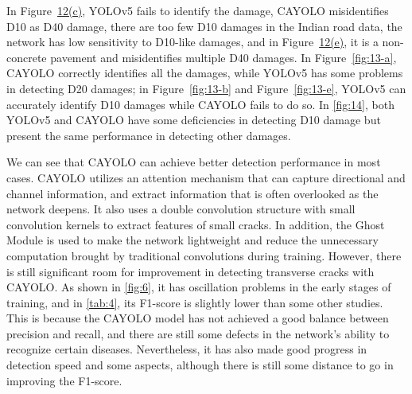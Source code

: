 \documentclass[sensors,article,submit,moreauthors]{Definitions/mdpi}
\begin{document}
    In Figure~\hyperref[fig:12-c]{12(c)}, YOLOv5 fails to identify the damage, CAYOLO misidentifies D10 as D40 damage, there are too few D10 damages in the Indian road data, the network has low sensitivity to D10-like damages, and in Figure~\hyperref[fig:12-e]{12(e)}, it is a non-concrete pavement and misidentifies multiple D40 damages. In Figure~\autoref{fig:13-a}, CAYOLO correctly identifies all the damages, while YOLOv5 has some problems in detecting D20 damages; in Figure~\autoref{fig:13-b} and Figure~\autoref{fig:13-e}, YOLOv5 can accurately identify D10 damages while CAYOLO fails to do so. In \autoref{fig:14}, both YOLOv5 and CAYOLO have some deficiencies in detecting D10 damage but present the same performance in detecting other damages.

    We can see that CAYOLO can achieve better detection performance in most cases. CAYOLO utilizes an attention mechanism that can capture directional and channel information, and extract information that is often overlooked as the network deepens. It also uses a double convolution structure with small convolution kernels to extract features of small cracks. In addition, the Ghost Module is used to make the network lightweight and reduce the unnecessary computation brought by traditional convolutions during training. However, there is still significant room for improvement in detecting transverse cracks with CAYOLO. As shown in \autoref{fig:6}, it has oscillation problems in the early stages of training, and in \autoref{tab:4}, its F1-score is slightly lower than some other studies. This is because the CAYOLO model has not achieved a good balance between precision and recall, and there are still some defects in the network's ability to recognize certain diseases. Nevertheless, it has also made good progress in detection speed and some aspects, although there is still some distance to go in improving the F1-score.
\end{document}
